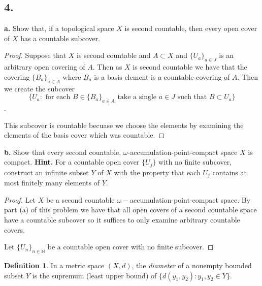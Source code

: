 \documentclass{amsart}
\theoremstyle{plain}
\theoremstyle{definition}
\newtheorem{definition}[theorem]{Definition}
\theoremstyle{remark}
\begin{document}
\vspace{.15in}
\noindent
\subsection*{4.} 

\noindent
{\bfseries a.} Show that, if a topological space $X$ is second countable, then every open cover of $X$ has a countable subcover.

\begin{proof}
   Suppose that $X$ is second countable and $A\subset X$ and $\{U_a\}_{a\in J}$ is an arbitrary open covering of $A$. Then as $X$ is second countable we have that the covering $\{B_a\}_{a\in A}$ where $B_a$ is a basis element is a countable covering of $A$. Then we create the subcover \[\{U_a: \text{ for each }B\in  \{B_a\}_{a\in A}  \text{ take a single } a\in J \text{ such that } B\subset U_a\}\]. 

   This subcover is countable becuase we choose the elements by examining the elements of the basis cover which was countable. 




\end{proof}

\vspace{.1in}
\noindent
{\bfseries b.} Show that every second countable, $\omega$-accumulation-point-compact space $X$ is compact. {\bfseries Hint.} For a countable open cover $\{ U_j\}$ with no finite subcover, construct an infinite subset $Y$ of $X$ with the property that each $U_j$ contains at most finitely many elements of $Y$. 

\begin{proof}
    Let $X$ be a second countable $\omega-$accumulation-point-compact space. By part (a) of this problem we have that all open covers of a second countable space have a countable subcover so it suffices to only examine arbitrary countable covers.

    Let $\{U_n\}_{n\in \mathbb{N}}$ be a countable open cover with no finite subcover. 
    

\end{proof}

\vspace{.15in}
\begin{definition} In a metric space $(X,d)$, the {\it diameter} of a nonempty bounded subset $Y$ is the supremum (least upper bound) of $\{ d(y_1, y_2) : y_1, y_2 \in Y\}$. \end{definition}
\end{document}
